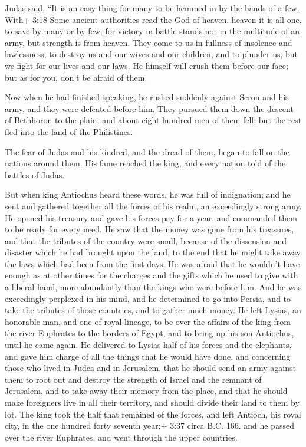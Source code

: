  Judas said, ``It is an easy thing for many to be hemmed in
by the hands of a few. With+ 3:18 Some ancient authorities read the God
of heaven. heaven it is all one, to save by many or by few;
 for victory in battle stands not in the multitude of an
army, but strength is from heaven.  They come to us in
fullness of insolence and lawlessness, to destroy us and our wives and
our children, and to plunder us,  but we fight for our
lives and our laws.  He himself will crush them before our
face; but as for you, don't be afraid of them.

 Now when he had finished speaking, he rushed suddenly
against Seron and his army, and they were defeated before him.
 They pursued them down the descent of Bethhoron to the
plain, and about eight hundred men of them fell; but the rest fled into
the land of the Philistines.

 The fear of Judas and his kindred, and the dread of them,
began to fall on the nations around them.  His fame reached
the king, and every nation told of the battles of Judas.

 But when king Antiochus heard these words, he was full of
indignation; and he sent and gathered together all the forces of his
realm, an exceedingly strong army.  He opened his treasury
and gave his forces pay for a year, and commanded them to be ready for
every need.  He saw that the money was gone from his
treasures, and that the tributes of the country were small, because of
the dissension and disaster which he had brought upon the land, to the
end that he might take away the laws which had been from the first days.
 He was afraid that he wouldn't have enough as at other
times for the charges and the gifts which he used to give with a liberal
hand, more abundantly than the kings who were before him. 
And he was exceedingly perplexed in his mind, and he determined to go
into Persia, and to take the tributes of those countries, and to gather
much money.  He left Lysias, an honorable man, and one of
royal lineage, to be over the affairs of the king from the river
Euphrates to the borders of Egypt,  and to bring up his son
Antiochus, until he came again.  He delivered to Lysias
half of his forces and the elephants, and gave him charge of all the
things that he would have done, and concerning those who lived in Judea
and in Jerusalem,  that he should send an army against them
to root out and destroy the strength of Israel and the remnant of
Jerusalem, and to take away their memory from the place, 
and that he should make foreigners live in all their territory, and
should divide their land to them by lot.  The king took the
half that remained of the forces, and left Antioch, his royal city, in
the one hundred forty seventh year;+ 3:37 circa B.C. 166. and he passed
over the river Euphrates, and went through the upper countries.

